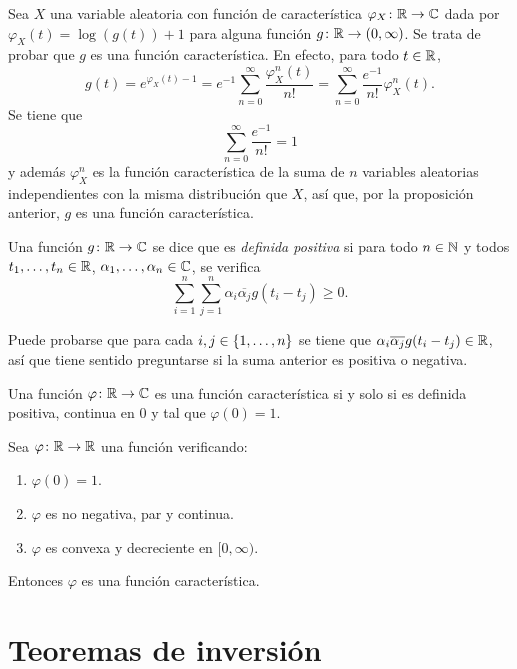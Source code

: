 \documentclass[a4paper, 11pt, extrafontsizes]{memoir}
\begin{document}
\begin{example}
    Sea $X$ una variable aleatoria con función de característica $\varphi_X \colon \mathbb R \to \mathbb C$ dada por
    $\varphi_X(t)= \log(g(t))+1$ para alguna función $g \colon \mathbb R \to (0,\infty)$. Se trata de probar que $g$ es una función característica. En efecto, para todo $t \in \mathbb R$,
    \[g(t) = e^{\varphi_X(t)-1} =e^{-1}\sum_{n=0}^\infty\frac{\varphi_X^n(t)}{n!} = \sum_{n=0}^\infty \frac{e^{-1}}{n!}\varphi_X^n(t).\]
    Se tiene que
    \[\sum_{n=0}^\infty \frac{e^{-1}}{n!} = 1\]
    y además $\varphi_X^n$ es la función característica de la suma de $n$ variables aleatorias independientes con la misma distribución que $X$, así que, por la proposición anterior, $g$ es una función característica.
\end{example}

\begin{definition}
    Una función $g \colon \mathbb R \to \mathbb C$ se dice que es \emph{definida positiva} si para todo $n \in \mathbb N$ y todos $t_1,\mathellipsis,t_n \in \mathbb R$, $\alpha_1,\mathellipsis,\alpha_n \in \mathbb C$, se verifica
    \[\sum_{i=1}^n \sum_{j=1}^n \alpha_i\overline{\alpha_j}g(t_i-t_j) \geq 0.\]
\end{definition}

Puede probarse que para cada $i,j\in\{1,\mathellipsis,n\}$ se tiene que $\alpha_i\overline{\alpha_j}g(t_i-t_j) \in \mathbb R$, así que tiene sentido preguntarse si la suma anterior es positiva o negativa.

\begin{theorem}
    Una función $\varphi \colon \mathbb R \to \mathbb C$ es una función característica si y solo si es definida positiva, continua en $0$ y tal que $\varphi(0)=1$.
\end{theorem}

\begin{theorem}
    Sea $\varphi \colon \mathbb R \to \mathbb R$ una función verificando:
    \begin{enumerate}
        \item $\varphi(0) = 1$.
        \item $\varphi$ es no negativa, par y continua.
        \item $\varphi$ es convexa y decreciente en $[0,\infty)$.
    \end{enumerate}
    Entonces $\varphi$ es una función característica.
\end{theorem}

\section{Teoremas de inversión}
\end{document}
